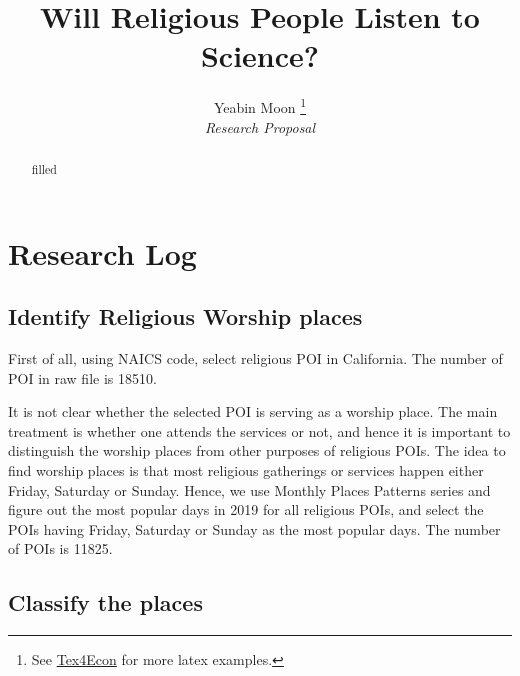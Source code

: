 \documentclass[12pt,english]{article}
\begin{document}
\title{Will Religious People Listen to Science?}

\author{Yeabin Moon \thanks{See \href{https://fanwangecon.github.io/Tex4Econ/}{Tex4Econ} for more latex examples.} \\ \textit{Research Proposal}}


\maketitle
\begin{abstract}
\singlespacing filled\end{abstract}
\vfill
\pagebreak{}

\section{Research Log}
\subsection{Identify Religious Worship places} 

First of all, using NAICS code, select religious POI in California. The number of POI in raw file is 18510. 

It is not clear whether the selected POI is serving as a worship place. The main treatment is whether one attends the services or not, and hence it is important to distinguish the worship places from other purposes of religious POIs. The idea to find worship places is that most religious gatherings or services happen either Friday, Saturday or Sunday. Hence, we use Monthly Places Patterns series and figure out the most popular days in 2019 for all religious POIs, and select the POIs having Friday, Saturday or Sunday as the most popular days. The number of POIs is 11825.

\subsection{Classify the  places} 
\end{document}
